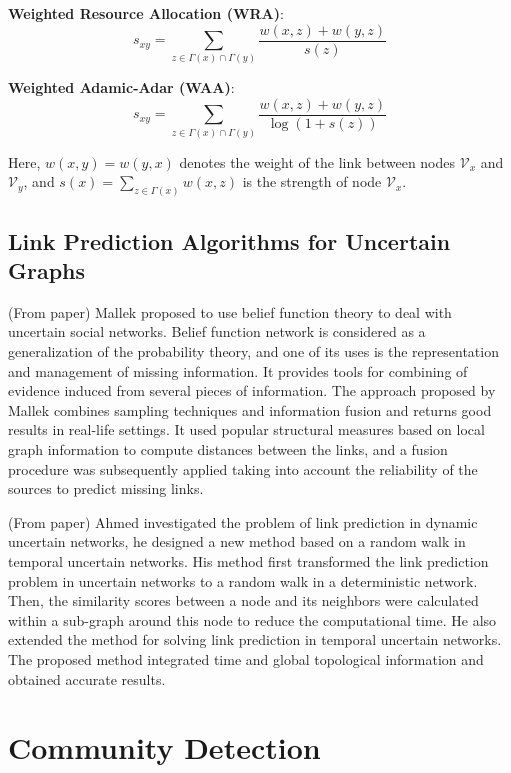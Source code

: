 \documentclass[\main/thesis.tex]{subfiles}
\begin{document}
\textbf{Weighted Resource Allocation (WRA)}:
\begin{equation}
s_{xy}=\sum_{z\in \Gamma(x)\cap\Gamma(y)}\frac{w(x,z)+w(y,z)}{s(z)}
\end{equation}

\textbf{Weighted Adamic-Adar (WAA)}:
\begin{equation}
s_{xy}=\sum_{z\in \Gamma(x)\cap\Gamma(y)}\frac{w(x,z)+w(y,z)}{\log(1+s(z))}
\end{equation}

Here, $w(x, y) = w(y, x)$ denotes the weight of the link between nodes $\mathcal{V}_x$ and $\mathcal{V}_y$, and $s(x)=\sum_{z\in\Gamma(x)}w(x,z)$ is the strength of node $\mathcal{V}_x$.

\subsection{Link Prediction Algorithms for Uncertain Graphs}
(From paper) Mallek \cite{mallek2016evidential} proposed to use belief function theory to deal with uncertain social networks. Belief function network is considered as a generalization of the probability theory, and one of its uses is the representation and management of missing information. It provides tools for combining of evidence induced from several pieces of information. The approach proposed by Mallek combines sampling techniques and information fusion and returns good results in real-life settings. It used popular structural measures based on local graph information to compute distances between the links, and a fusion procedure was subsequently applied taking into account the reliability of the sources to predict missing links.

(From paper) Ahmed \cite{ahmed2016efficient} investigated the problem of link prediction in dynamic uncertain networks, he designed a new method based on a random walk in temporal uncertain networks. His method first transformed the link prediction problem in uncertain networks to a random walk in a deterministic network. Then, the similarity scores between a node and its neighbors were calculated within a sub-graph around this node to reduce the computational time. He also extended the method for solving link prediction in temporal uncertain networks. The proposed method integrated time and global topological information and obtained accurate results.

\section{Community Detection}
\end{document}
